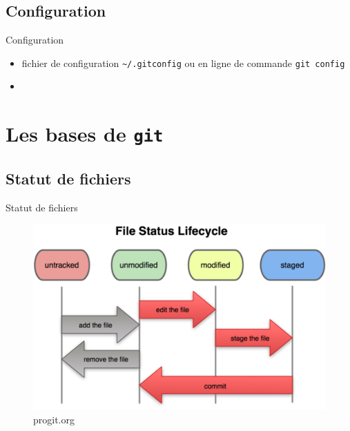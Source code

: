 \documentclass{beamer}
\newcommand{\git}{\texttt{git}}
\begin{document}
\subsection*{Configuration}
\begin{frame}[containsverbatim]{Configuration}
  \begin{itemize}
  \item fichier de configuration \lstinline|~/.gitconfig| ou en ligne de commande \lstinline|git config|
  \item
  \end{itemize}
\end{frame}

\section{Les bases de \git}
\subsection*{Statut de fichiers}
\begin{frame}{Statut de fichiers}
  \begin{figure}
    \begin{center}
      \includegraphics[scale=0.7]{img/Status_lifecycle.png}
    \end{center}
    \caption{progit.org}
  \end{figure}
\end{frame}
\end{document}
